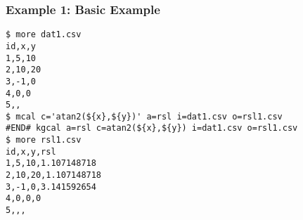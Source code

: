 \subsubsection*{Example 1: Basic Example}



\begin{Verbatim}[baselinestretch=0.7,frame=single]
$ more dat1.csv
id,x,y
1,5,10
2,10,20
3,-1,0
4,0,0
5,,
$ mcal c='atan2(${x},${y})' a=rsl i=dat1.csv o=rsl1.csv
#END# kgcal a=rsl c=atan2(${x},${y}) i=dat1.csv o=rsl1.csv
$ more rsl1.csv
id,x,y,rsl
1,5,10,1.107148718
2,10,20,1.107148718
3,-1,0,3.141592654
4,0,0,0
5,,,
\end{Verbatim}
